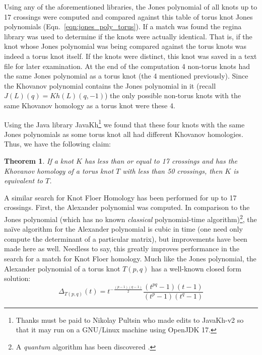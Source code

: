 \documentclass{article}
\theoremstyle{plain}
\newtheorem{theorem}{Theorem}
\begin{document}
        Using any of the aforementioned libraries, the Jones polynomial of all
        knots up to 17 crossings were computed and compared against this table
        of torus knot Jones polynomials (Eqn.~\ref{eqn:jones_poly_torus}).
        If a match was found the regina library was used to determine if the
        knots were actually identical. That is, if the knot whose Jones
        polynomial was being compared against the torus knots was indeed a
        torus knot itself. If the knots were distinct, this knot was saved in a
        text file for later examination. At the end of the computation 4
        non-torus knots had the same Jones polynomial as a torus knot
        (the 4 mentioned previously).
        Since the Khovanov polynomial contains the Jones polynomial in it
        (recall $J(L)(q)=Kh(L)(q,-1)$) the only possible non-torus knots with
        the same Khovanov homology as a torus knot were these 4.
        \par\hfill\par
        Using the Java library JavaKh\footnote{%
            Thanks must be paid to Nikolay Pultsin who made edits to
            JavaKh-v2 so that it may run on a GNU/Linux machine using
            OpenJDK 17.
        }
        we found that these four knots with the same Jones polynomials as some
        torus knot all had different Khovanov homologies. Thus, we have the
        following claim:
        \begin{theorem}
            If a knot $K$ has less than or equal to 17 crossings and has the
            Khovanov homology of a torus knot $T$ with less than 50 crossings,
            then $K$ is equivalent to $T$.
        \end{theorem}
        A similar search for Knot Floer Homology has been performed for up to 17
        crossings. First, the Alexander polynomial was computed.
        In comparison to the Jones polynomial (which has no known
        \textit{classical} polynomial-time algorithm)\footnote{%
            A \textit{quantum} algorithm has been discovered
            \cite{JonesQuantumAlgorithm}.
        }, the na\"{i}ve algorithm for the Alexander polynomial is cubic in
        time (one need only compute the determinant of a particular matrix), but
        improvements have been made here as well. Needless to say, this greatly
        improves performance in the search for a match for Knot Floer homology.
        Much like the Jones polynomial, the Alexander polynomial of a torus
        knot $T(p,q)$ has a well-known closed form solution:
        \begin{equation}
            \Delta_{T(p,q)}(t)=
            t^{-\frac{(p-1)(q-1)}{2}}\frac{(t^{pq}-1)(t-1)}{(t^{p}-1)(t^{q}-1)}
        \end{equation}
\end{document}
